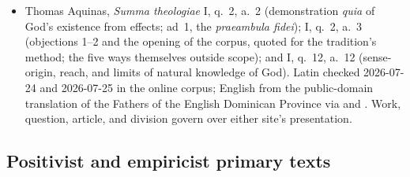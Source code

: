 {\fontsize{8.6}{9.6}\selectfont
\begin{itemize}[itemsep=0pt,parsep=0pt,topsep=0.05em]
\item Thomas Aquinas, \emph{Summa theologiae} I, q.~2, a.~2 (demonstration \emph{quia} of God's existence from effects; ad~1, the \emph{praeambula fidei}); I, q.~2, a.~3 (objections 1--2 and the opening of the corpus, quoted for the tradition's method; the five ways themselves outside scope); and I, q.~12, a.~12 (sense-origin, reach, and limits of natural knowledge of God). Latin checked 2026-07-24 and 2026-07-25 in the  online corpus; English from the public-domain translation of the Fathers of the English Dominican Province via  and . Work, question, article, and division govern over either site's presentation.
\end{itemize}}

\subsection*{Positivist and empiricist primary texts}

